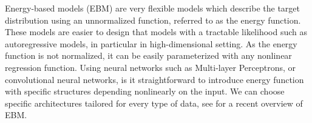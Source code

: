 \documentclass[english,graybox,envcountchap,envcountsame,sectrefs,shortlabels]{svmono}
\theoremstyle{style}
\begin{document}
Energy-based models (EBM) are very flexible models which describe the target distribution using an unnormalized function, referred to as the energy function. These models are easier to design that models with a tractable likelihood such as autoregressive models, in particular in high-dimensional setting. As the energy function is not normalized, it can
be easily parameterized with any nonlinear regression function. Using neural networks such as Multi-layer Perceptrons, or convolutional neural networks, is it straightforward to introduce energy function with specific structures depending nonlinearly on the input. We can choose specific
architectures tailored for every type of data, see \cite{song2021train} for a recent overview of EBM.
\end{document}
